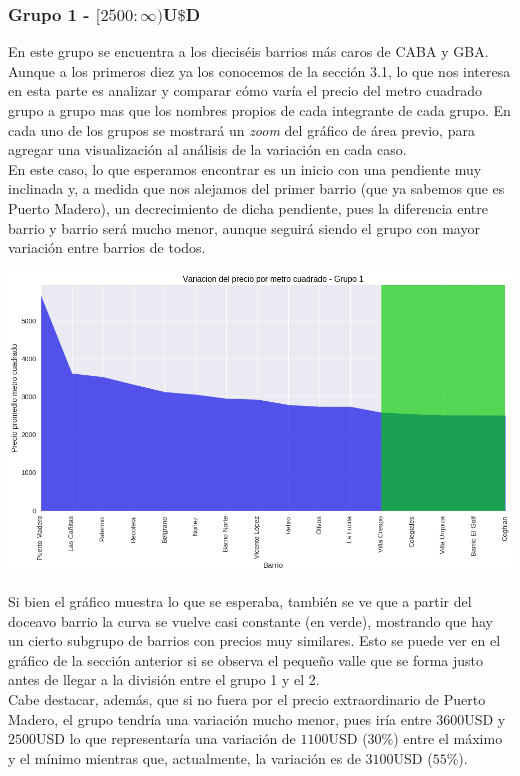 \documentclass[a4paper, 10pt]{article}
\newcommand\tab[1][0.5cm]{\hspace*{#1}}
\begin{document}
				\subsubsection{Grupo 1 - $[2500:\infty)$U$\$$D}
					En este grupo se encuentra a los dieciséis barrios más caros de CABA y GBA. Aunque a los primeros diez ya los
					conocemos de la sección 3.1, lo que nos interesa en esta parte es analizar y comparar cómo varía el precio
					del metro cuadrado grupo a grupo mas que los nombres propios de cada integrante de cada grupo. En cada uno
					de los grupos se mostrará un \emph{zoom} del gráfico de área previo, para agregar una visualización al
					análisis de la variación en cada caso. \\
					\tab En este caso, lo que esperamos encontrar es un inicio con una pendiente muy inclinada y, a medida que
					nos alejamos del primer barrio (que ya sabemos que es Puerto Madero), un decrecimiento de dicha pendiente,
					pues la diferencia entre barrio y barrio será mucho menor, aunque seguirá siendo el grupo con mayor variación
					entre barrios de todos.
					\begin{center}
   		    				\includegraphics[width=\textwidth]{images/m2Group1Area}
				  	\end{center}
				  	\tab Si bien el gráfico muestra lo que se esperaba, también se ve que a partir del doceavo barrio la curva
				  	se vuelve casi constante (en verde), mostrando que hay un cierto subgrupo de barrios con precios muy 
				  	similares. Esto se puede ver en el gráfico de la sección anterior si se observa el pequeño valle que 
				  	se forma justo antes 	de llegar a la división entre el grupo 1 y el 2. \\
				  	\tab Cabe destacar, además, que si no fuera por el precio extraordinario de Puerto Madero, el grupo tendría
				  	una variación mucho menor, pues iría entre $3600$USD y $2500$USD lo que representaría una variación de
				  	$1100$USD ($30\%$) entre el máximo y el mínimo mientras que, actualmente, la variación es de $3100$USD
				  	($55\%$).
\end{document}
